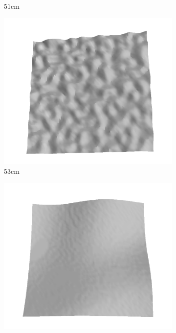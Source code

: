 \documentclass[../document.tex]{subfiles}
\begin{document}
\begin{figure}[htbp]
\begin{subfigure}[b]{0.19\textwidth}
    \caption{$51$cm}
    \end{subfigure}
    \begin{subfigure}[b]{0.19\textwidth}
    \includegraphics[width=\linewidth]{../img/5/train/all/53-patch-3d-majavi-26.png}
    \caption{$53$cm}
    \end{subfigure}
    \begin{subfigure}[b]{0.19\textwidth}
    \includegraphics[width=\linewidth]{../img/5/train/all/54-patch-3d-majavi-27.png}

\end{subfigure}
\end{figure}
\end{document}
